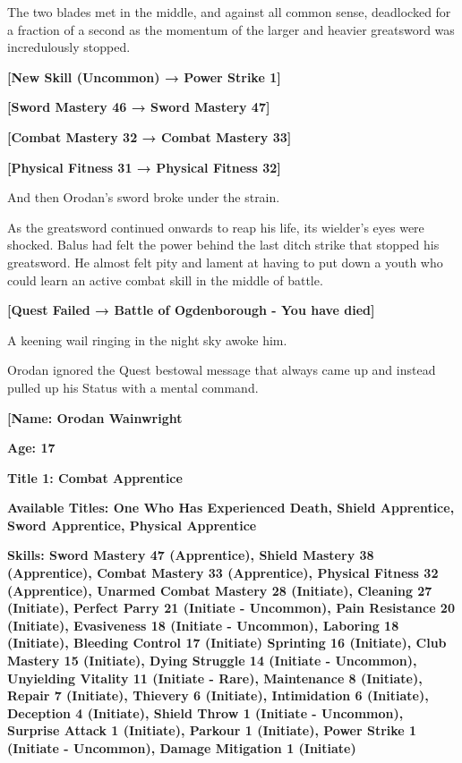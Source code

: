 \documentclass[a4paper,10pt]{book}
\begin{document}
The two blades met in the middle, and against all common sense, deadlocked for a fraction of a second as the momentum of the larger and heavier greatsword was incredulously stopped.\par
\textbf{[New Skill (Uncommon) → Power Strike 1]}\par
\textbf{[Sword Mastery 46 → Sword Mastery 47]}\par
\textbf{[Combat Mastery 32 → Combat Mastery 33]}\par
\textbf{[Physical Fitness 31 → Physical Fitness 32]}\par
And then Orodan’s sword broke under the strain.\par
As the greatsword continued onwards to reap his life, its wielder’s eyes were shocked. Balus had felt the power behind the last ditch strike that stopped his greatsword. He almost felt pity and lament at having to put down a youth who could learn an active combat skill in the middle of battle.\par
\textbf{[Quest Failed → Battle of Ogdenborough - You have died]}\par
A keening wail ringing in the night sky awoke him.\par
Orodan ignored the Quest bestowal message that always came up and instead pulled up his Status with a mental command.\par
\textbf{[Name: Orodan Wainwright}\par
\textbf{Age: 17}\par
\textbf{Title 1: Combat Apprentice}\par
\textbf{Available Titles: One Who Has Experienced Death, Shield Apprentice, Sword Apprentice, Physical Apprentice}\par
\textbf{Skills: Sword Mastery 47 (Apprentice), Shield Mastery 38 (Apprentice), Combat Mastery 33 (Apprentice), Physical Fitness 32 (Apprentice), Unarmed Combat Mastery 28 (Initiate), Cleaning 27 (Initiate), Perfect Parry 21 (Initiate - Uncommon), Pain Resistance 20 (Initiate), Evasiveness 18 (Initiate - Uncommon), Laboring 18 (Initiate), Bleeding Control 17 (Initiate) Sprinting 16 (Initiate), Club Mastery 15 (Initiate), Dying Struggle 14 (Initiate - Uncommon), Unyielding Vitality 11 (Initiate - Rare), Maintenance 8 (Initiate), Repair 7 (Initiate), Thievery 6 (Initiate), Intimidation 6 (Initiate), Deception 4 (Initiate), Shield Throw 1 (Initiate - Uncommon), Surprise Attack 1 (Initiate), Parkour 1 (Initiate), Power Strike 1 (Initiate - Uncommon), Damage Mitigation 1 (Initiate)}\par
\end{document}
